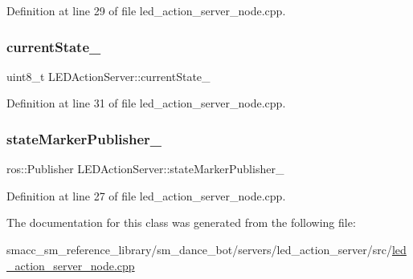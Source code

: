 Definition at line 29 of file led\+\_\+action\+\_\+server\+\_\+node.\+cpp.

\mbox{\label{classLEDActionServer_a1dc456e987dc331501ad6ff2215661ff}} 
\subsubsection{\texorpdfstring{current\+State\+\_\+}{currentState\_}}
{\footnotesize\ttfamily uint8\+\_\+t L\+E\+D\+Action\+Server\+::current\+State\+\_\+}



Definition at line 31 of file led\+\_\+action\+\_\+server\+\_\+node.\+cpp.

\mbox{\label{classLEDActionServer_a4168a1e4a17eb1d65aaa059ce0c52086}} 
\subsubsection{\texorpdfstring{state\+Marker\+Publisher\+\_\+}{stateMarkerPublisher\_}}
{\footnotesize\ttfamily ros\+::\+Publisher L\+E\+D\+Action\+Server\+::state\+Marker\+Publisher\+\_\+}



Definition at line 27 of file led\+\_\+action\+\_\+server\+\_\+node.\+cpp.



The documentation for this class was generated from the following file\+:\begin{DoxyCompactItemize}
\item 
smacc\+\_\+sm\+\_\+reference\+\_\+library/sm\+\_\+dance\+\_\+bot/servers/led\+\_\+action\+\_\+server/src/\hyperlink{servers_2led__action__server_2src_2led__action__server__node_8cpp}{led\+\_\+action\+\_\+server\+\_\+node.\+cpp}\end{DoxyCompactItemize}
